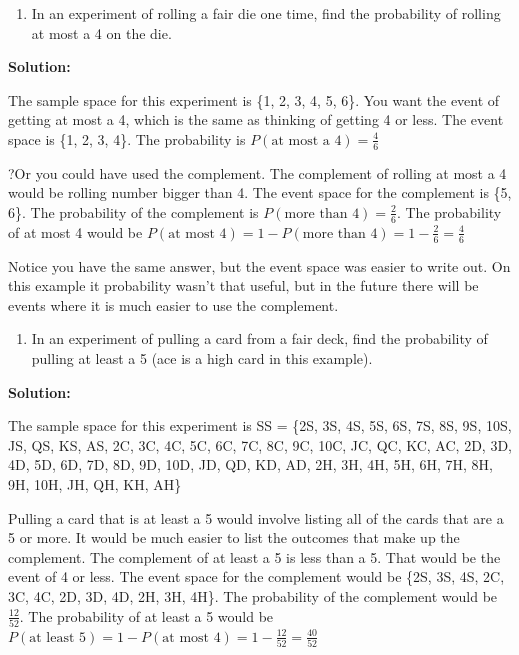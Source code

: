 \documentclass[]{book}
\providecommand{\tightlist}{%
  \setlength{\itemsep}{0pt}\setlength{\parskip}{0pt}}
\begin{document}
\begin{enumerate}
\def\labelenumi{\alph{enumi}.}
\tightlist
\item
  In an experiment of rolling a fair die one time, find the probability of rolling at most a 4 on the die.
\end{enumerate}

\textbf{Solution:}

The sample space for this experiment is \{1, 2, 3, 4, 5, 6\}. You want the event of getting at most a 4, which is the same as thinking of getting 4 or less. The event space is \{1, 2, 3, 4\}. The probability is \(P(\text{at most a 4})=\frac{4}{6}\)

?Or you could have used the complement. The complement of rolling at
most a 4 would be rolling number bigger than 4. The event space for
the complement is \{5, 6\}. The probability of the complement is \(P(\text{more than 4})=\frac{2}{6}\). The probability of at most 4 would be \(P(\text{at most 4})=1-P(\text{more than 4})=1-\frac{2}{6}=\frac{4}{6}\)

Notice you have the same answer, but the event space was easier to
write out. On this example it probability wasn't that useful, but in
the future there will be events where it is much easier to use the
complement.

\begin{enumerate}
\def\labelenumi{\alph{enumi}.}
\setcounter{enumi}{1}
\tightlist
\item
  In an experiment of pulling a card from a fair deck, find the probability of pulling at least a 5 (ace is a high card in this example).
\end{enumerate}

\textbf{Solution:}

The sample space for this experiment is SS = \{2S, 3S, 4S, 5S, 6S, 7S, 8S, 9S, 10S, JS, QS, KS, AS, 2C, 3C, 4C, 5C, 6C, 7C, 8C, 9C, 10C, JC, QC, KC, AC, 2D, 3D, 4D, 5D, 6D, 7D, 8D, 9D, 10D, JD, QD, KD, AD, 2H, 3H, 4H, 5H, 6H, 7H, 8H, 9H, 10H,
JH, QH, KH, AH\}

Pulling a card that is at least a 5 would involve listing all of the cards that are a 5 or more. It would be much easier to list the outcomes that make up the complement. The complement of at least a 5 is less than a 5. That would be the event of 4 or less. The event space for the complement would be \{2S, 3S, 4S, 2C, 3C, 4C, 2D, 3D, 4D, 2H, 3H, 4H\}. The probability of the complement would be \(\frac{12}{52}\). The probability of at least a 5 would be \(P(\text{at least 5})=1-P(\text{at most 4})=1-\frac{12}{52}=\frac{40}{52}\)
\end{document}
